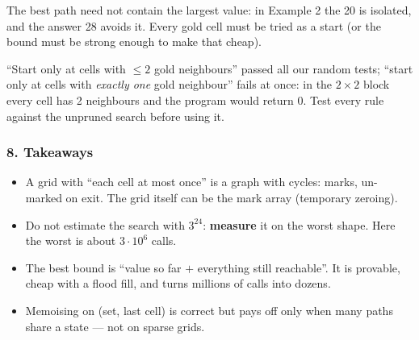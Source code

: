 \begin{warningbox}
The best path need not contain the largest value: in Example 2 the 20 is isolated, and the answer 28 avoids it. Every gold cell must be tried as a start (or the bound must be strong enough to make that cheap).
\end{warningbox}

\begin{warningbox}
``Start only at cells with $\le 2$ gold neighbours'' passed all our random tests; ``start only at cells with \emph{exactly one} gold neighbour'' fails at once: in the $2 \times 2$ block every cell has 2 neighbours and the program would return 0. Test every rule against the unpruned search before using it.
\end{warningbox}

\subsubsection*{8. Takeaways}

\begin{itemize}[leftmargin=*]
    \item A grid with ``each cell at most once'' is a graph with cycles: marks, un-marked on exit. The grid itself can be the mark array (temporary zeroing).
    \item Do not estimate the search with $3^{24}$: \textbf{measure} it on the worst shape. Here the worst is about $3 \cdot 10^6$ calls.
    \item The best bound is ``value so far $+$ everything still reachable''. It is provable, cheap with a flood fill, and turns millions of calls into dozens.
    \item Memoising on (set, last cell) is correct but pays off only when many paths share a state --- not on sparse grids.
\end{itemize}

